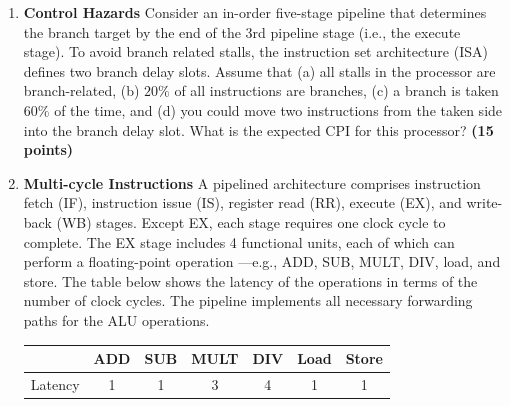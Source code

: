 \documentclass[a4paper, 11pt]{exam}
\begin{document}
\begin{enumerate}
\begin{enumerate}
	\end{enumerate}
    
    \item \textbf{Control Hazards} Consider an in-order five-stage pipeline that determines the branch
target by the end of the 3rd pipeline stage (i.e., the execute stage). To avoid branch related stalls, the instruction set architecture (ISA) defines two branch delay slots. Assume that (a) all stalls in the processor are branch-related, (b) $20\%$ of all instructions are branches, (c) a branch is taken $60\%$ of the time, and (d) you could move two instructions from the taken side into the branch delay slot. What is the expected CPI for
this processor? \textbf{(15 points)} 

	\newline
    
	\item \textbf{Multi-cycle Instructions} A pipelined architecture comprises instruction fetch (IF), instruction issue (IS), register read (RR), execute (EX), and write-back (WB) stages. Except EX, each stage requires one clock cycle to complete. The EX stage includes 4
functional units, each of which can perform a floating-point operation —e.g., ADD, SUB, MULT, DIV, load, and store. The table below shows the latency of the operations in terms of the number of clock cycles. The pipeline implements all necessary forwarding paths for the ALU operations.

\begin{center}
\begin{tabular}{ |c|c|c|c|c|c|c| } 
 \hline
  & ADD & SUB & MULT & DIV & Load & Store \\ 
  \hline
 Latency & 1 & 1 & 3 & 4 & 1 & 1 \\ 
 \hline
\end{tabular}
\end{center}


\end{enumerate}
\end{document}
